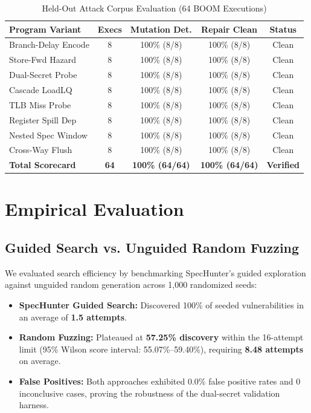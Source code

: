 \documentclass[conference,10pt]{IEEEtran}
\begin{document}
\begin{table}[t]
\centering
\caption{Held-Out Attack Corpus Evaluation (64 BOOM Executions)}
\label{tab:corpus}
\begin{tabular}{lcccc}
\toprule
\textbf{Program Variant} & \textbf{Execs} & \textbf{Mutation Det.} & \textbf{Repair Clean} & \textbf{Status} \\
\midrule
Branch-Delay Encode & 8 & 100\% (8/8) & 100\% (8/8) & Clean \\
Store-Fwd Hazard & 8 & 100\% (8/8) & 100\% (8/8) & Clean \\
Dual-Secret Probe & 8 & 100\% (8/8) & 100\% (8/8) & Clean \\
Cascade LoadLQ & 8 & 100\% (8/8) & 100\% (8/8) & Clean \\
TLB Miss Probe & 8 & 100\% (8/8) & 100\% (8/8) & Clean \\
Register Spill Dep & 8 & 100\% (8/8) & 100\% (8/8) & Clean \\
Nested Spec Window & 8 & 100\% (8/8) & 100\% (8/8) & Clean \\
Cross-Way Flush & 8 & 100\% (8/8) & 100\% (8/8) & Clean \\
\midrule
\textbf{Total Scorecard} & \textbf{64} & \textbf{100\% (64/64)} & \textbf{100\% (64/64)} & \textbf{Verified} \\
\bottomrule
\end{tabular}
\end{table}

\section{Empirical Evaluation}

\subsection{Guided Search vs. Unguided Random Fuzzing}
We evaluated search efficiency by benchmarking SpecHunter's guided exploration against unguided random generation across 1,000 randomized seeds:
\begin{itemize}
    \item \textbf{SpecHunter Guided Search:} Discovered 100\% of seeded vulnerabilities in an average of \textbf{1.5 attempts}.
    \item \textbf{Random Fuzzing:} Plateaued at \textbf{57.25\% discovery} within the 16-attempt limit (95\% Wilson score interval: 55.07\%--59.40\%), requiring \textbf{8.48 attempts} on average.
    \item \textbf{False Positives:} Both approaches exhibited 0.0\% false positive rates and 0 inconclusive cases, proving the robustness of the dual-secret validation harness.
\end{itemize}
\end{document}
